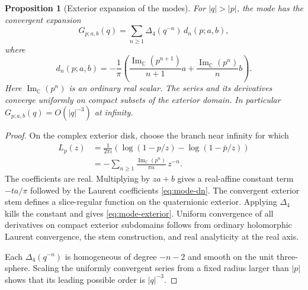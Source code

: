 \documentclass[11pt,a4paper]{article}
\numberwithin{equation}{section}
\newtheorem{proposition}[theorem]{Proposition}
\theoremstyle{definition}
\theoremstyle{remark}
\newcommand{\C}{\mathbb C}
\newcommand{\Fu}{\Delta_4}
\newcommand{\ImC}{\operatorname{Im}_{\C}}
\begin{document}
\begin{proposition}[Exterior expansion of the modes]\label{prop:exterior}
For $|q|>|p|$, the mode has the convergent expansion
\begin{equation}
 G_{p;a,b}(q)=\sum_{n\ge1}\Fu(q^{-n})\,d_n(p;a,b),\label{eq:mode-exterior}
\end{equation}
where
\begin{equation}
 d_n(p;a,b)=-\frac1\pi\left(
     \frac{\ImC(p^{n+1})}{n+1}a
       +\frac{\ImC(p^n)}{n}b\right).\label{eq:mode-dn}
\end{equation}
Here $\ImC(p^n)$ is an ordinary real scalar. The series and its
derivatives converge uniformly on compact subsets of the exterior domain.
In particular $G_{p;a,b}(q)=O(|q|^{-3})$ at infinity.
\end{proposition}
\begin{proof}
On the complex exterior disk, choose the branch near infinity for which
\begin{align*}
 L_p(z)&=\frac1{2\pi\iota}
   \left(\log(1-p/z)-\log(1-\bar p/z)\right)\\
 &=-\sum_{n\ge1}\frac{\ImC(p^n)}{\pi n}\,z^{-n}.
\end{align*}
The coefficients are real. Multiplying by $za+b$ gives a real-affine
constant term $-ta/\pi$ followed by the Laurent coefficients
\eqref{eq:mode-dn}. The convergent exterior stem defines a slice-regular
function on the quaternionic exterior. Applying $\Fu$ kills the
constant and gives \eqref{eq:mode-exterior}. Uniform convergence of
all derivatives on compact exterior subdomains follows from ordinary
holomorphic Laurent convergence, the stem construction, and real
analyticity at the real axis.

Each $\Fu(q^{-n})$ is homogeneous of degree $-n-2$ and smooth on the
unit three-sphere. Scaling the uniformly convergent series from a fixed
radius larger than $|p|$ shows that its leading possible order is
$|q|^{-3}$.
\end{proof}
\end{document}
